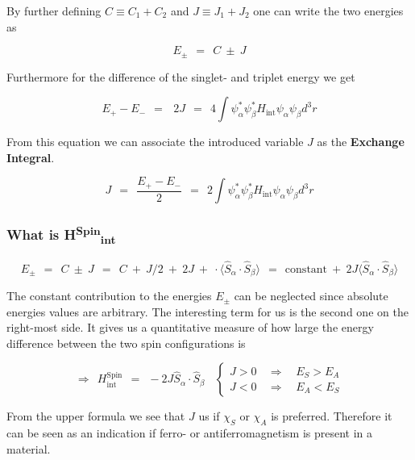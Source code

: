 \documentclass[10pt]{report}
\numberwithin{equation}{chapter}
\begin{document}
By further defining $C \equiv C_1+C_2$ and $J \equiv J_1+J_2$ one can write the two energies as

\begin{equation}
  E_\pm ~~=~~ C ~\pm~ J
\end{equation}

Furthermore for the difference of the singlet- and triplet energy we get

\begin{equation}
  E_+ - E_- ~~=~~~2J ~~=~~ 4 \int \psi^*_\alpha \psi^*_\beta H_\text{int} \psi_\alpha \psi_\beta d^3r
\end{equation}

From this equation we can associate the introduced variable $J$ as the \textbf{Exchange Integral}.

\begin{equation}
  J ~~=~~ \frac{E_+-E_-}{2} ~~=~~ 2 \int \psi^*_\alpha \psi^*_\beta H_\text{int} \psi_\alpha \psi_\beta d^3r
\end{equation}


\subsubsection{What is H\textsuperscript{Spin}\textsubscript{int}}

\begin{equation}
  E_\pm ~~=~~ C ~\pm~ J ~~=~~ C ~+~ J/2 ~+~ 2J ~+~ \cdot \langle \hat{S}_\alpha \cdot \hat{S}_\beta \rangle ~~=~~ \text{constant} ~+~ 2J \langle \hat{S}_\alpha \cdot \hat{S}_\beta \rangle
\end{equation}

The constant contribution to the energies $E_\pm$ can be neglected since absolute energies values are arbitrary. The interesting term for us is the second one on the right-most side. It gives us a quantitative measure of how large the energy difference between the two spin configurations is

\begin{equation}
  \Rightarrow ~~ H^\text{Spin}_\text{int} ~~=~~ - 2J \hat{S}_\alpha \cdot \hat{S}_\beta ~~~~ \left\{
  \begin{array}{lcr}
    J > 0 & ~~ \Rightarrow ~~ & E_S > E_A\\
    J < 0 & ~~ \Rightarrow ~~ & E_A < E_S
  \end{array}\right.
\end{equation}


From the upper formula we see that $J$ us if $\chi_S$ or $\chi_A$ is preferred. Therefore it can be seen as an indication if ferro- or antiferromagnetism is present in a material.
\end{document}
